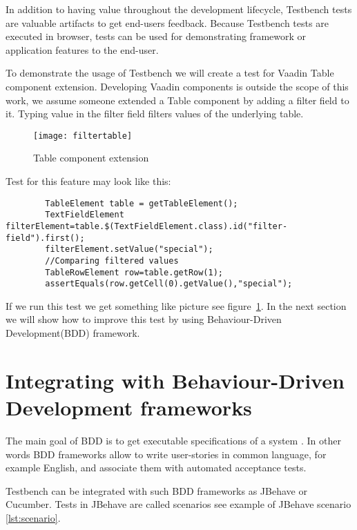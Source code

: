 In addition to having value throughout the development lifecycle,
Testbench tests are valuable artifacts to get end-users feedback.
Because Testbench tests are executed in browser, tests can be used 
for demonstrating framework or application features to the end-user. 
  
To demonstrate the usage of Testbench we will create a test for Vaadin Table
component extension. Developing Vaadin components is outside the scope of
this work, we assume someone extended a Table component by adding a filter field to
it. Typing value in the filter field filters values of the underlying table. 
	\begin{figure}
	\label{fig:filtertable}
	\texttt{[image: filtertable]}
	\caption{Table component extension}
	\end{figure}

Test for this feature may look like this:
  	\lstset{language=Java}
  	\begin{lstlisting}
		TableElement table = getTableElement();
		TextFieldElement filterElement=table.$(TextFieldElement.class).id("filter-field").first();
		filterElement.setValue("special");
		//Comparing filtered values
		TableRowElement row=table.getRow(1);
		assertEquals(row.getCell(0).getValue(),"special");
	\end{lstlisting}	
	
If we run this test we get something like picture see
figure~\ref{fig:filtertable}.
In the next section we will show how to improve this test by using
Behaviour-Driven Development(BDD) framework.

\section{Integrating with Behaviour-Driven Development frameworks}

The main goal of BDD is to get executable specifications of a system
\cite{studyBDD}. In other words BDD frameworks allow  to write user-stories in
common language, for example English, and associate them with automated
acceptance tests.

Testbench can be integrated with such BDD frameworks as JBehave or Cucumber.
Tests in JBehave are called scenarios see example of JBehave scenario
\ref{lst:scenario}.

